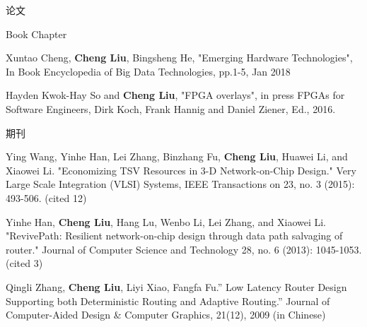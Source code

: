 \documentclass{resume} %
\begin{document}
\begin{rSection}{论文}
    \begin{rSubsection} {Book Chapter}{}{}{}
	\item Xuntao Cheng, \textbf{Cheng Liu}, Bingsheng He, "Emerging Hardware Technologies", In Book 
		Encyclopedia of Big Data Technologies, pp.1-5, Jan 2018
    \item Hayden Kwok-Hay So and \textbf{Cheng Liu}, "FPGA overlays", in press FPGAs for Software
        Engineers, Dirk Koch, Frank Hannig and Daniel Ziener, Ed., 2016.  
    \end{rSubsection}

    \begin{rSubsection} {期刊}{}{}{}
    \item Ying Wang, Yinhe Han, Lei Zhang, Binzhang Fu, \textbf{Cheng Liu}, Huawei Li, and Xiaowei Li.
        "Economizing TSV Resources in 3-D Network-on-Chip Design." Very Large Scale Integration
        (VLSI) Systems, IEEE Transactions on 23, no. 3 (2015): 493-506. (cited 12)  
    \item Yinhe Han, \textbf{Cheng Liu}, Hang Lu, Wenbo Li, Lei Zhang, and Xiaowei Li. "RevivePath:
        Resilient network-on-chip design through data path salvaging of router." Journal of Computer
        Science and Technology 28, no. 6 (2013): 1045-1053. (cited 3)
    \item Qingli Zhang, \textbf{Cheng Liu}, Liyi Xiao, Fangfa Fu.” Low Latency Router Design Supporting both
        Deterministic Routing and Adaptive Routing.” Journal of Computer-Aided Design \& Computer
        Graphics, 21(12), 2009 (in Chinese)
    \end{rSubsection}


\end{rSection}
\end{document}
